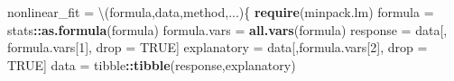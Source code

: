 \documentclass[
]{article}
\newenvironment{Shaded}{\begin{snugshade}}{\end{snugshade}}
\newcommand{\ConstantTok}[1]{\textcolor[rgb]{0.56,0.35,0.01}{#1}}
\newcommand{\DecValTok}[1]{\textcolor[rgb]{0.00,0.00,0.81}{#1}}
\newcommand{\FunctionTok}[1]{\textcolor[rgb]{0.13,0.29,0.53}{\textbf{#1}}}
\newcommand{\NormalTok}[1]{#1}
\newcommand{\OtherTok}[1]{\textcolor[rgb]{0.56,0.35,0.01}{#1}}
\newcommand{\SpecialCharTok}[1]{\textcolor[rgb]{0.81,0.36,0.00}{\textbf{#1}}}
\begin{document}
\begin{Shaded}
\begin{Highlighting}[]
\NormalTok{nonlinear\_fit }\OtherTok{=}\NormalTok{ \textbackslash{}(formula,data,method,...)\{}
  \FunctionTok{require}\NormalTok{(minpack.lm)}
\NormalTok{  formula }\OtherTok{=}\NormalTok{ stats}\SpecialCharTok{::}\FunctionTok{as.formula}\NormalTok{(formula)}
\NormalTok{  formula.vars }\OtherTok{=} \FunctionTok{all.vars}\NormalTok{(formula)}
\NormalTok{  response }\OtherTok{=}\NormalTok{ data[, formula.vars[}\DecValTok{1}\NormalTok{], drop }\OtherTok{=} \ConstantTok{TRUE}\NormalTok{]}
\NormalTok{  explanatory }\OtherTok{=}\NormalTok{ data[,formula.vars[}\DecValTok{2}\NormalTok{], drop }\OtherTok{=} \ConstantTok{TRUE}\NormalTok{]}
\NormalTok{  data }\OtherTok{=}\NormalTok{ tibble}\SpecialCharTok{::}\FunctionTok{tibble}\NormalTok{(response,explanatory)}
  

\end{Highlighting}
\end{Shaded}
\end{document}
